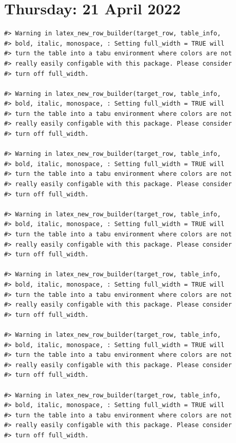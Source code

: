 \documentclass[
]{book}
\begin{document}
\hypertarget{thursday-21-april-2022}{%
\section*{Thursday: 21 April 2022}\label{thursday-21-april-2022}}

\begin{verbatim}
#> Warning in latex_new_row_builder(target_row, table_info,
#> bold, italic, monospace, : Setting full_width = TRUE will
#> turn the table into a tabu environment where colors are not
#> really easily configable with this package. Please consider
#> turn off full_width.

#> Warning in latex_new_row_builder(target_row, table_info,
#> bold, italic, monospace, : Setting full_width = TRUE will
#> turn the table into a tabu environment where colors are not
#> really easily configable with this package. Please consider
#> turn off full_width.

#> Warning in latex_new_row_builder(target_row, table_info,
#> bold, italic, monospace, : Setting full_width = TRUE will
#> turn the table into a tabu environment where colors are not
#> really easily configable with this package. Please consider
#> turn off full_width.

#> Warning in latex_new_row_builder(target_row, table_info,
#> bold, italic, monospace, : Setting full_width = TRUE will
#> turn the table into a tabu environment where colors are not
#> really easily configable with this package. Please consider
#> turn off full_width.

#> Warning in latex_new_row_builder(target_row, table_info,
#> bold, italic, monospace, : Setting full_width = TRUE will
#> turn the table into a tabu environment where colors are not
#> really easily configable with this package. Please consider
#> turn off full_width.

#> Warning in latex_new_row_builder(target_row, table_info,
#> bold, italic, monospace, : Setting full_width = TRUE will
#> turn the table into a tabu environment where colors are not
#> really easily configable with this package. Please consider
#> turn off full_width.

#> Warning in latex_new_row_builder(target_row, table_info,
#> bold, italic, monospace, : Setting full_width = TRUE will
#> turn the table into a tabu environment where colors are not
#> really easily configable with this package. Please consider
#> turn off full_width.


\end{verbatim}
\end{document}
